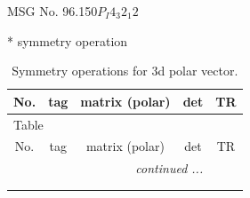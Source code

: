 \documentclass[fleqn,8pt]{jsarticle}
\begin{document}
\setcounter{MaxMatrixCols}{32}

\renewcommand{\tablename}{Table~}
\renewcommand{\figurename}{Figure~}
\begin{center}
\LARGE
MSG No. 96.150\quad$P_{I}4_{3}2_{1}2$
\end{center}
* symmetry operation
\renewcommand{\arraystretch}{1.3}
\begin{longtable}{ccccc}
\caption{Symmetry operations for 3d polar vector.}
 \\
 \hline \hline
No. & tag & matrix (polar) & det & TR \\ \hline \endfirsthead

\multicolumn{4}{l}{\tablename\ \thetable{}} \\
 \hline \hline
No. & tag & matrix (polar) & det & TR \\ \hline \endhead

 \hline \hline
\multicolumn{4}{r}{\footnotesize\it continued ...} \\ \endfoot

 \hline \hline
\multicolumn{4}{r}{} \\ \endlastfoot


\end{longtable}
\end{document}
